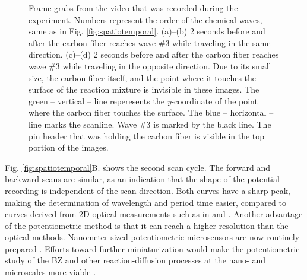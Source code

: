 \documentclass[3p]{elsarticle}
\begin{document}
\begin{figure}
\centering
{}
\caption{Frame grabs from the video that was recorded during the experiment.
Numbers represent the order of the chemical waves, same as in Fig. \ref{fig:spatiotemporal}.
(a)--(b) 2 seconds before and after the carbon fiber reaches wave \#3 while traveling in the same direction.
(c)--(d) 2 seconds before and after the carbon fiber reaches wave \#3 while traveling in the opposite direction.
Due to its small size, the carbon fiber itself, and the point where it touches the surface of the reaction mixture is invisible in these images.
The green -- vertical -- line reperesents the \emph{y}-coordinate of the point where the carbon fiber touches the surface.
The blue -- horizontal -- line marks the scanline.
Wave \#3 is marked by the black line.
The pin header that was holding the carbon fiber is visible in the top portion of the images.
}
\label{fig:grabs2}
\end{figure}

Fig. \ref{fig:spatiotemporal}B. shows the second scan cycle.
The forward and backward scans are similar, as an indication that the shape of the potential recording is independent of the scan direction.
Both curves have a sharp peak, making the determination of wavelength and period time easier, compared to curves derived from 2D optical measurements such as in \cite{muller1985structure} and \cite{nagy1990experimental}.
Another advantage of the potentiometric method is that it can reach a higher resolution than the optical methods.
Nanometer sized potentiometric microsensors are now routinely prepared \cite{elsamadisi2010polished}.
Efforts toward further miniaturization would make the potentiometric study of the BZ and other reaction-diffusion processes at the nano- and microscales more viable \cite{epstein2016reaction}.
\end{document}
